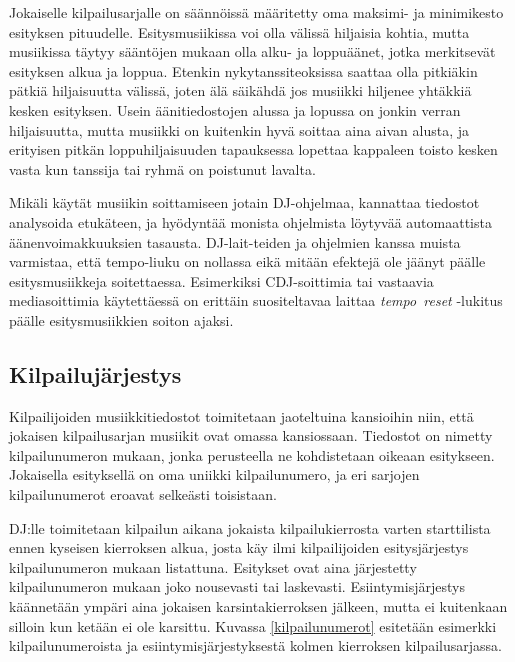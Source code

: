 \documentclass[12pt, a4paper, oneside]{article}
\begin{document}
Jokaiselle kilpailusarjalle on säännöissä määritetty oma maksimi- ja minimikesto esityksen pituudelle.
Esitysmusiikissa voi olla välissä hiljaisia kohtia,
mutta musiikissa täytyy sääntöjen mukaan olla alku- ja loppuäänet,
jotka merkitsevät esityksen alkua ja loppua.
Etenkin nykytanssiteoksissa saattaa olla pitkiäkin pätkiä hiljaisuutta välissä,
joten älä säikähdä jos musiikki hiljenee yhtäkkiä kesken esityksen.
Usein äänitiedostojen alussa ja lopussa on jonkin verran hiljaisuutta,
mutta musiikki on kuitenkin hyvä soittaa aina aivan alusta,
ja erityisen pitkän loppuhiljaisuuden tapauksessa lopettaa kappaleen toisto kesken vasta kun tanssija tai ryhmä on poistunut lavalta.

Mikäli käytät musiikin soittamiseen jotain DJ-ohjelmaa,
kannattaa tiedostot analysoida etukäteen,
ja hyödyntää monista ohjelmista löytyvää automaattista äänenvoimakkuuksien tasausta.
DJ-lait-teiden ja ohjelmien kanssa muista varmistaa,
että tempo-liuku on nollassa eikä mitään efektejä ole jäänyt päälle esitysmusiikkeja soitettaessa.
Esimerkiksi CDJ-soittimia tai vastaavia mediasoittimia käytettäessä on erittäin suositeltavaa laittaa \textit{tempo~reset} -lukitus päälle esitysmusiikkien soiton ajaksi.

\subsection{Kilpailujärjestys}

Kilpailijoiden musiikkitiedostot toimitetaan jaoteltuina kansioihin niin,
että jokaisen kilpailusarjan musiikit ovat omassa kansiossaan.
Tiedostot on nimetty kilpailunumeron mukaan,
jonka perusteella ne kohdistetaan oikeaan esitykseen.
Jokaisella esityksellä on oma uniikki kilpailunumero,
ja eri sarjojen kilpailunumerot eroavat selkeästi toisistaan.

DJ:lle toimitetaan kilpailun aikana jokaista kilpailukierrosta varten starttilista ennen kyseisen kierroksen alkua,
josta käy ilmi kilpailijoiden esitysjärjestys kilpailunumeron mukaan listattuna.
Esitykset ovat aina järjestetty kilpailunumeron mukaan joko nousevasti tai laskevasti.
Esiintymisjärjestys käännetään ympäri aina jokaisen karsintakierroksen jälkeen,
mutta ei kuitenkaan silloin kun ketään ei ole karsittu.
Kuvassa \ref{kilpailunumerot} esitetään esimerkki kilpailunumeroista ja esiintymisjärjestyksestä kolmen kierroksen kilpailusarjassa.
\end{document}
